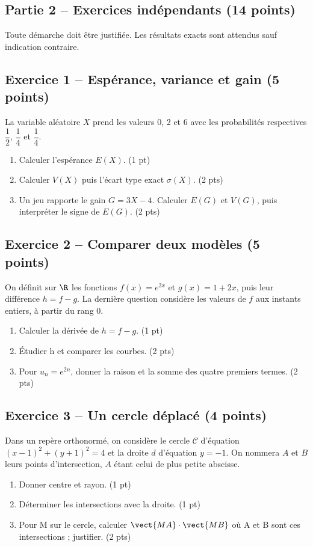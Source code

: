 \mxnewpage\subsection*{Partie 2 -- Exercices indépendants (14 points)}
Toute démarche doit être justifiée. Les résultats exacts sont attendus sauf indication contraire.
\subsection*{Exercice 1 -- Espérance, variance et gain (5 points)}
La variable aléatoire $X$ prend les valeurs 0, 2 et 6 avec les probabilités respectives $\dfrac12$, $\dfrac14$ et $\dfrac14$.
\begin{enumerate}
\item Calculer l’espérance $E(X)$. \hfill(1 pt)
\item Calculer $V(X)$ puis l’écart type exact $\sigma(X)$. \hfill(2 pts)
\item Un jeu rapporte le gain $G=3X-4$. Calculer $E(G)$ et $V(G)$, puis interpréter le signe de $E(G)$. \hfill(2 pts)
\end{enumerate}
\subsection*{Exercice 2 -- Comparer deux modèles (5 points)}
On définit sur $\R$ les fonctions $f(x)=e^{2x}$ et $g(x)=1+2x$, puis leur différence $h=f-g$. La dernière question considère les valeurs de $f$ aux instants entiers, à partir du rang 0.
\begin{enumerate}
\item Calculer la dérivée de $h=f-g$. \hfill(1 pt)
\item Étudier h et comparer les courbes. \hfill(2 pts)
\item Pour $u_n=e^{2n}$, donner la raison et la somme des quatre premiers termes. \hfill(2 pts)
\end{enumerate}
\subsection*{Exercice 3 -- Un cercle déplacé (4 points)}
Dans un repère orthonormé, on considère le cercle $\mathcal C$ d’équation $(x-1)^2+(y+1)^2=4$ et la droite $d$ d’équation $y=-1$. On nommera $A$ et $B$ leurs points d’intersection, $A$ étant celui de plus petite abscisse.
\begin{enumerate}
\item Donner centre et rayon. \hfill(1 pt)
\item Déterminer les intersections avec la droite. \hfill(1 pt)
\item Pour M sur le cercle, calculer $\vect{MA}\cdot\vect{MB}$ où A et B sont ces intersections ; justifier. \hfill(2 pts)
\end{enumerate}
